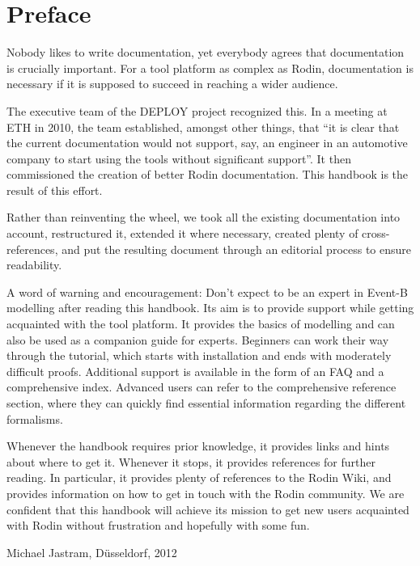 \documentclass[twoside,10pt]{book}
\begin{document}
\chapter*{Preface}
\label{preface}
\pagestyle{headings}

Nobody likes to write documentation, yet everybody agrees that documentation is crucially important.  For a tool platform as complex as Rodin, documentation is necessary if it is supposed to succeed in reaching a wider audience.

The executive team of the DEPLOY project recognized this. In a meeting at ETH in 2010, the team established, amongst other things, that ``it is clear that the current documentation would not support, say, an engineer in an automotive company to start using the tools without significant support''.  It then commissioned the creation of better Rodin documentation.  This handbook is the result of this effort.

Rather than reinventing the wheel, we took all the existing documentation into account, restructured it, extended it where necessary, created plenty of cross-references, and put the resulting document through an editorial process to ensure readability.

A word of warning and encouragement: Don't expect to be an expert in Event-B modelling after reading this handbook.  Its aim is to provide support while getting acquainted with the tool platform. It provides the basics of modelling and can also be used as a companion guide for experts.  Beginners can work their way through the tutorial, which starts with installation and ends with moderately difficult proofs.  Additional support is available in the form of an FAQ and a comprehensive index.  Advanced users can refer to the comprehensive reference section, where they can quickly find essential information regarding the different formalisms.

Whenever the handbook requires prior knowledge, it provides links and hints about where to get it.  Whenever it stops, it provides references for further reading.  In particular, it provides plenty of references to the Rodin Wiki, and provides information on how to get in touch with the Rodin community.  We are confident that this handbook will achieve its mission to get new users acquainted with Rodin without frustration and hopefully with some fun.

\begin{flushright}
  Michael Jastram, Düsseldorf, 2012
\end{flushright}
\end{document}
